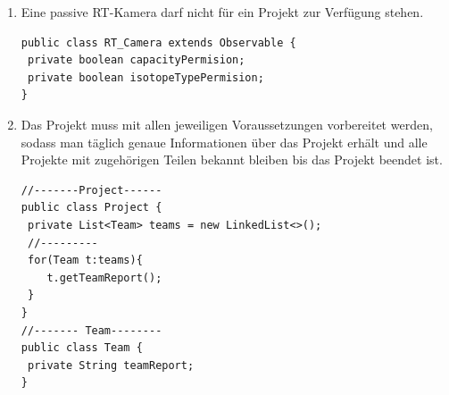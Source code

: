 \begin{enumerate}
\begin{lstlisting}[frame=single]
   /**
     * @param model of RT Camera and here will be check capacity safety!
     */
    private void setDevice_Source_Maximum_Capacity(MODEL model, Isotope isotope) {
        switch (model) {
            case SIGMA_880:
                this.isotopetypes.add(ISOTOPETYPE.SELENIUM_75);
                this.isotopetypes.add(ISOTOPETYPE.IRIDIUM_192);
                this.isotopetypes.add(ISOTOPETYPE.COBALT_60);
                this.isotopetypes.add(ISOTOPETYPE.YTTERBIUM_169);
                this.isotopetypes.add(ISOTOPETYPE.CAESIUM_137);
                if (isotope.getIsotopetype().equals(ISOTOPETYPE.SELENIUM_75) && isotope.getActivity() <= 150) {
                    this.setCapacityPermision(true);
                    this.setIsotopes(isotope);
                }
                //130Ci 4.81TBq
                if (isotope.getIsotopetype().equals(ISOTOPETYPE.IRIDIUM_192) && isotope.getActivity() <= 130) {
                    this.setCapacityPermision(true);
                    this.setIsotopes(isotope);
                }
                // 0.025 Ci = 25mCi
                if (isotope.getIsotopetype().equals(ISOTOPETYPE.COBALT_60) && isotope.getActivity() <= 0.025) {
                    this.setCapacityPermision(true);
                    this.setIsotopes(isotope);
                }

                if (isotope.getIsotopetype().equals(ISOTOPETYPE.YTTERBIUM_169) && isotope.getActivity() <= 20) {
                    this.setCapacityPermision(true);
                    this.setIsotopes(isotope);
                }

                //0.38 Ci = 380mCi
                if (isotope.getIsotopetype().equals(ISOTOPETYPE.CAESIUM_137) && isotope.getActivity() <= 0.38) {
                    this.setCapacityPermision(true);
                    this.setIsotopes(isotope);
                }
                break;
                case OMEGA_880:
                .........
      }
  
  }
\end{lstlisting}
\item Eine passive RT-Kamera darf nicht für ein Projekt zur Verfügung stehen.\\
\begin{lstlisting}[frame=single]
public class RT_Camera extends Observable {
 private boolean capacityPermision;
 private boolean isotopeTypePermision;
}
\end{lstlisting}

\item Das Projekt muss mit allen jeweiligen Voraussetzungen vorbereitet werden, sodass man
täglich genaue Informationen über das Projekt erhält und alle Projekte mit zugehörigen
Teilen bekannt bleiben bis das Projekt beendet ist.
\begin{lstlisting}[frame=single]
//-------Project------
public class Project {
 private List<Team> teams = new LinkedList<>();
 //---------
 for(Team t:teams){
 	t.getTeamReport();
 }
}
//------- Team--------
public class Team {
 private String teamReport;
}


\end{lstlisting}
\end{enumerate}
